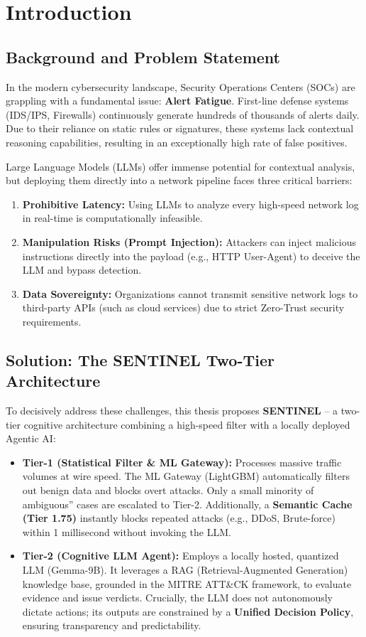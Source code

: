 \chapter{Introduction}
\label{ch:introduction}

\section{Background and Problem Statement}
In the modern cybersecurity landscape, Security Operations Centers (SOCs) are grappling with a fundamental issue: \textbf{Alert Fatigue}. First-line defense systems (IDS/IPS, Firewalls) continuously generate hundreds of thousands of alerts daily. Due to their reliance on static rules or signatures, these systems lack contextual reasoning capabilities, resulting in an exceptionally high rate of false positives.

Large Language Models (LLMs) offer immense potential for contextual analysis, but deploying them directly into a network pipeline faces three critical barriers:
\begin{enumerate}
    \item \textbf{Prohibitive Latency:} Using LLMs to analyze every high-speed network log in real-time is computationally infeasible.
    \item \textbf{Manipulation Risks (Prompt Injection):} Attackers can inject malicious instructions directly into the payload (e.g., HTTP User-Agent) to deceive the LLM and bypass detection.
    \item \textbf{Data Sovereignty:} Organizations cannot transmit sensitive network logs to third-party APIs (such as cloud services) due to strict Zero-Trust security requirements.
\end{enumerate}

\section{Solution: The SENTINEL Two-Tier Architecture}
To decisively address these challenges, this thesis proposes \textbf{SENTINEL} -- a two-tier cognitive architecture combining a high-speed filter with a locally deployed Agentic AI:
\begin{itemize}
    \item \textbf{Tier-1 (Statistical Filter \& ML Gateway):} Processes massive traffic volumes at wire speed. The ML Gateway (LightGBM) automatically filters out benign data and blocks overt attacks. Only a small minority of ambiguous'' cases are escalated to Tier-2. Additionally, a \textbf{Semantic Cache (Tier 1.75)} instantly blocks repeated attacks (e.g., DDoS, Brute-force) within 1 millisecond without invoking the LLM.
    \item \textbf{Tier-2 (Cognitive LLM Agent):} Employs a locally hosted, quantized LLM (Gemma-9B). It leverages a RAG (Retrieval-Augmented Generation) knowledge base, grounded in the MITRE ATT\&CK framework, to evaluate evidence and issue verdicts. Crucially, the LLM does not autonomously dictate actions; its outputs are constrained by a \textbf{Unified Decision Policy}, ensuring transparency and predictability.
\end{itemize}

